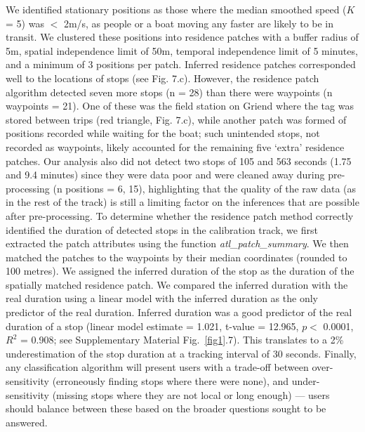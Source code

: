 \begin{refsection}[sorting=nyt]
    We identified stationary positions as those where the median smoothed speed ($K$ = 5) was $<$ 2m/s, as people or a boat moving any faster are likely to be in transit.
    We clustered these positions into residence patches with a buffer radius of 5m, spatial independence limit of 50m, temporal independence limit of 5 minutes, and a minimum of 3 positions per patch.
    Inferred residence patches corresponded well to the locations of stops (see Fig. 7.c).
    However, the residence patch algorithm detected seven more stops (n = 28) than there were waypoints (n waypoints = 21).
    One of these was the field station on Griend where the tag was stored between trips (red triangle, Fig. 7.c), while another patch was formed of positions recorded while waiting for the boat; such unintended stops, not recorded as waypoints, likely accounted for the remaining five `extra' residence patches.
    Our analysis also did not detect two stops of 105 and 563 seconds (1.75 and 9.4 minutes) since they were data poor and were cleaned away during pre-processing (n positions = 6, 15), highlighting that the quality of the raw data (as in the rest of the track) is still a limiting factor on the inferences that are possible after pre-processing.
    To determine whether the residence patch method correctly identified the duration of detected stops in the calibration track, we first extracted the patch attributes using the function \textit{atl\_patch\_summary}.
    We then matched the patches to the waypoints by their median coordinates (rounded to 100 metres).
    We assigned the inferred duration of the stop as the duration of the spatially matched residence patch.
    We compared the inferred duration with the real duration using a linear model with the inferred duration as the only predictor of the real duration.
    Inferred duration was a good predictor of the real duration of a stop (linear model estimate = 1.021, t-value = 12.965, $p <$ 0.0001, $R^2$ = 0.908; see Supplementary Material Fig.~\ref{fig1}.7).
    This translates to a 2\% underestimation of the stop duration at a tracking interval of 30 seconds.
    Finally, any classification algorithm will present users with a trade-off between over-sensitivity (erroneously finding stops where there were none), and under-sensitivity (missing stops where they are not local or long enough) --- users should balance between these based on the broader questions sought to be answered.


\end{refsection}
